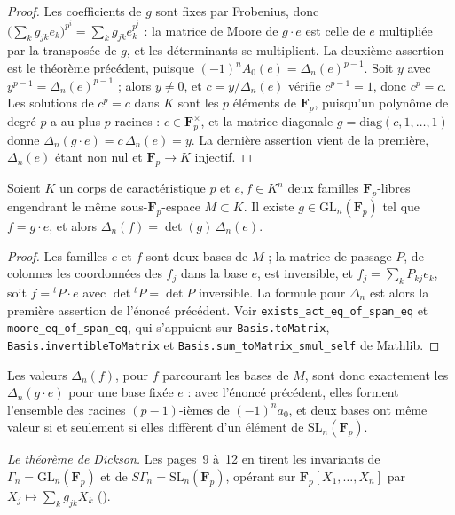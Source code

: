 \begin{proof}
Les coefficients de $g$ sont fixes par Frobenius, donc $\bigl(\sum_k g_{jk} e_k\bigr)^{p^i} = \sum_k g_{jk} e_k^{p^i}$ : la matrice de Moore de $g \cdot e$ est celle de $e$ multipliée par la transposée de $g$, et les déterminants se multiplient. La deuxième assertion est le théorème précédent, puisque $(-1)^n A_0(e) = \Delta_n(e)^{p-1}$. Soit $y$ avec $y^{p-1} = \Delta_n(e)^{p-1}$ ; alors $y \neq 0$, et $c = y/\Delta_n(e)$ vérifie $c^{p-1} = 1$, donc $c^p = c$. Les solutions de $c^p = c$ dans $K$ sont les $p$ éléments de $\mathbf F_p$, puisqu'un polynôme de degré $p$ a au plus $p$ racines : $c \in \mathbf F_p^\times$, et la matrice diagonale $g = \mathrm{diag}(c, 1, \dots, 1)$ donne $\Delta_n(g \cdot e) = c\,\Delta_n(e) = y$. La dernière assertion vient de la première, $\Delta_n(e)$ étant non nul et $\mathbf F_p \to K$ injectif.
\end{proof}

\begin{lemme}
Soient $K$ un corps de caractéristique $p$ et $e, f \in K^n$ deux familles $\mathbf F_p$-libres engendrant le même sous-$\mathbf F_p$-espace $M \subset K$. Il existe $g \in \mathrm{GL}_n(\mathbf F_p)$ tel que $f = g \cdot e$, et alors $\Delta_n(f) = \det(g)\,\Delta_n(e)$.
\end{lemme}

\begin{proof}
Les familles $e$ et $f$ sont deux bases de $M$ ; la matrice de passage $P$, de colonnes les coordonnées des $f_j$ dans la base $e$, est inversible, et $f_j = \sum_k P_{kj} e_k$, soit $f = {}^t\!P \cdot e$ avec $\det {}^t\!P = \det P$ inversible. La formule pour $\Delta_n$ est alors la première assertion de l'énoncé précédent. Voir \texttt{exists\_act\_eq\_of\_span\_eq} et \texttt{moore\_eq\_of\_span\_eq}, qui s'appuient sur \texttt{Basis.\allowbreak{}toMatrix}, \texttt{Basis.\allowbreak{}invertibleToMatrix} et \texttt{Basis.\allowbreak{}sum\_toMatrix\_smul\_self} de Mathlib.
\end{proof}

\noindent Les valeurs $\Delta_n(f)$, pour $f$ parcourant les bases de $M$, sont donc exactement les $\Delta_n(g \cdot e)$ pour une base fixée $e$ : avec l'énoncé précédent, elles forment l'ensemble des racines $(p-1)$-ièmes de $(-1)^n a_0$, et deux bases ont même valeur si et seulement si elles diffèrent d'un élément de $\mathrm{SL}_n(\mathbf F_p)$.

\noindent\emph{Le théorème de Dickson.} Les pages~9 à~12 en tirent les invariants de $\Gamma_n = \mathrm{GL}_n(\mathbf F_p)$ et de $S\Gamma_n = \mathrm{SL}_n(\mathbf F_p)$, opérant sur $\mathbf F_p[X_1, \dots, X_n]$ par $X_j \mapsto \sum_k g_{jk} X_k$ ().


